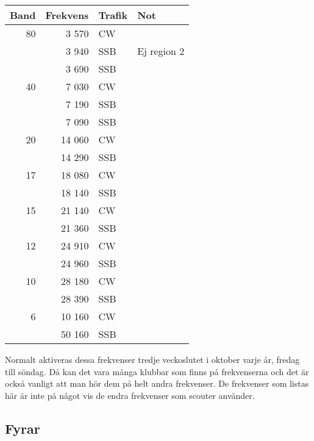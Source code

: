 \begin{tabular}{rrll}
	\textbf{Band} & \textbf{Frekvens} & \textbf{Trafik} & \textbf{Not} \\ \hline
	           80 &             3 570 & CW              &  \\
	              &             3 940 & SSB             & Ej region 2  \\
	              &             3 690 & SSB             &  \\ \hline
	           40 &             7 030 & CW              &  \\
	              &             7 190 & SSB             &  \\
	              &             7 090 & SSB             &  \\ \hline
	           20 &            14 060 & CW              &  \\
	              &            14 290 & SSB             &  \\ \hline
	           17 &            18 080 & CW              &  \\
	              &            18 140 & SSB             &  \\ \hline
	           15 &            21 140 & CW              &  \\
	              &            21 360 & SSB             &  \\ \hline
	           12 &            24 910 & CW              &  \\
	              &            24 960 & SSB             &  \\ \hline
	           10 &            28 180 & CW              &  \\
	              &            28 390 & SSB             &  \\ \hline
	            6 &            10 160 & CW              &  \\
	              &            50 160 & SSB             &  \\ \hline
\end{tabular}



Normalt aktiveras dessa frekvenser tredje veckoslutet i oktober varje år, fredag till söndag. Då kan det vara många klubbar som finns på frekvenserna och det är också vanligt att man hör dem på helt andra frekvenser. De frekvenser som listas här är inte på något vis de endra frekvenser som scouter använder.

\subsection{Fyrar}

